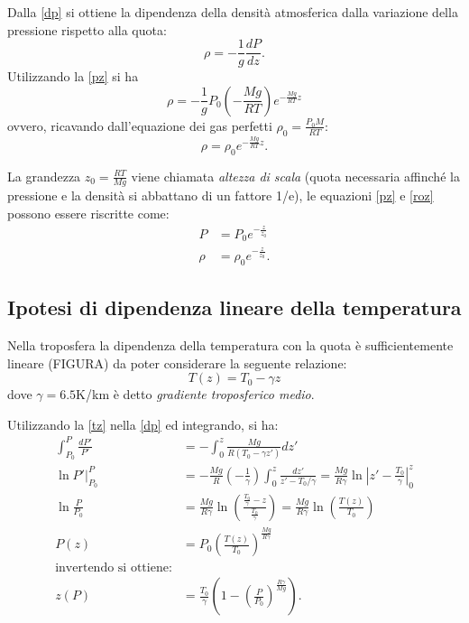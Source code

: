 Dalla \eqref{dp} si ottiene la dipendenza della densità atmosferica dalla variazione della pressione rispetto alla quota:
\begin{equation}
\rho=-\frac{1}{g}\frac{dP}{dz}.
\end{equation}
Utilizzando la \eqref{pz} si ha
\begin{equation}
\rho=-\frac{1}{g}P_0\left(-\frac{Mg}{RT}\right)e^{-\frac{Mg}{RT}z}
\end{equation}
ovvero, ricavando dall'equazione dei gas perfetti $\rho_0=\frac{P_0 M}{RT}$:
\begin{equation}\label{roz}
\rho=\rho_0 e^{-\frac{Mg}{RT}z}.
\end{equation}

La grandezza $z_0=\frac{RT}{Mg}$ viene chiamata \emph{altezza di scala} (quota necessaria affinché la pressione e la densità si abbattano di un fattore 1/e), le equazioni \eqref{pz} e \eqref{roz} possono essere riscritte come:
\begin{align}
P&=P_0e^{-\frac{z}{z_0}}\\
\rho&=\rho_0e^{-\frac{z}{z_0}}.
\end{align}

\subsection{Ipotesi di dipendenza lineare della temperatura}
Nella troposfera la dipendenza della temperatura con la quota è sufficientemente lineare (FIGURA) da poter considerare la seguente relazione:
\begin{equation}\label{tz}
	T(z)=T_0-\gamma z
\end{equation}
dove $\gamma=6.5$K/km è detto \emph{gradiente troposferico medio}.

Utilizzando la \eqref{tz} nella \eqref{dp} ed integrando, si ha:
\begin{align}
	\int_{P_0}^{P}\frac{dP'}{P'}&=-\int_{0}^{z}\frac{Mg}{R(T_0-\gamma z')}dz'\\
	\ln P'\Big|_{P_0}^P&=-\frac{Mg}{R}\left( -\frac{1}{\gamma}\right)\int_{0}^{z}\frac{dz'}{z'-T_0/\gamma}=\frac{Mg}{R\gamma}\ln\left|z'-\frac{T_0}{\gamma}\right|^z_0\\
	\ln\frac{P}{P_0}&=\frac{Mg}{R\gamma}\ln\left(\frac{\frac{T_0}{\gamma}-z}{\frac{T_0}{\gamma}}\right)=\frac{Mg}{R\gamma}\ln\left(\frac{T(z)}{T_0}\right)\\
	P(z)&=P_0\left(\frac{T(z)}{T_0}\right)^{\frac{Mg}{R\gamma}}\\
\text{invertendo si ottiene:}\nonumber\\
	z(P)&=\frac{T_0}{\gamma}\left(1-\left(\frac{P}{P_0}\right)^{\frac{R\gamma}{Mg}}\right).\label{zp}
\end{align}\\

